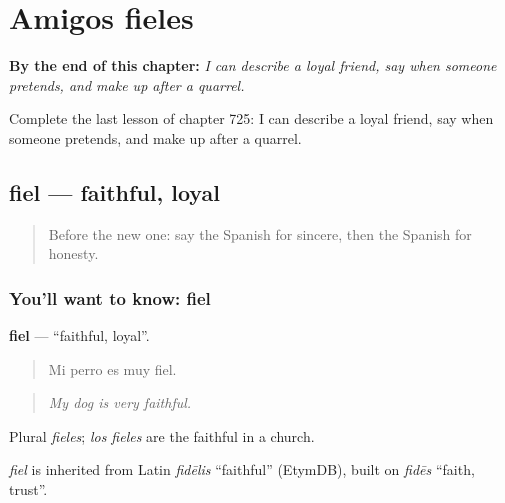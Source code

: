 
\chapter{Amigos fieles}
\label{ch:es-amigos-fieles}

\begin{chapteropening}
\textbf{By the end of this chapter:} \emph{I can describe a loyal friend, say when someone pretends, and make up after a quarrel.}

Complete the last lesson of chapter 725: I can describe a loyal friend, say when someone pretends, and make up after a quarrel.
\end{chapteropening}

\section[fiel]{fiel — faithful, loyal}

\label{lesson:ES-C725-fiel}



\begin{quote}
Before the new one: say the Spanish for sincere, then the Spanish for honesty.
\end{quote}

\subsection*{You'll want to know: fiel}
\textbf{fiel} — \textquotedblleft{}faithful, loyal\textquotedblright{}.

\begin{quote}
Mi perro es muy fiel.
\end{quote}

\begin{quote}
\emph{My dog is very faithful.}
\end{quote}

Plural \emph{fieles}; \emph{los fieles} are the faithful in a church.

\begin{cousinweb}
\emph{fiel} is inherited from Latin \emph{fidēlis} \textquotedblleft{}faithful\textquotedblright{} (EtymDB), built on \emph{fidēs} \textquotedblleft{}faith, trust\textquotedblright{}.
\end{cousinweb}

